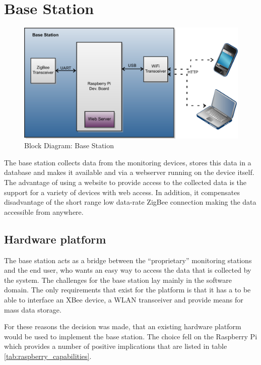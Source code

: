 \section{Base Station}\begin{figure}
\includegraphics[width=\textwidth]{Images/BaseStationBlockDiagram}
\caption{Block Diagram: Base Station}
\label{fig:block_base_station}
\end{figure}

The base station collects data from the monitoring devices, stores this data in a database and makes it available and via a webserver running on the device itself. The advantage of using a website to provide access to the collected data is the support for a variety of devices with web access. In addition, it compensates disadvantage of the short range low data-rate ZigBee connection making the data accessible from anywhere.  


\subsection{Hardware platform}
The base station acts as a bridge between the “proprietary” monitoring stations and the end user, who wants an easy way to access the data that is collected by the system. The challenges for the base station lay mainly in the software domain. The only requirements that exist for the platform is that it has a to be able to interface an XBee device, a WLAN transceiver and provide means for mass data storage. 

For these reasons the decision was made, that an existing hardware platform would be used to implement the base station. The choice fell on the Raspberry Pi which provides a number of positive implications that are listed in table \ref{tab:raspberry_capabilities}.



